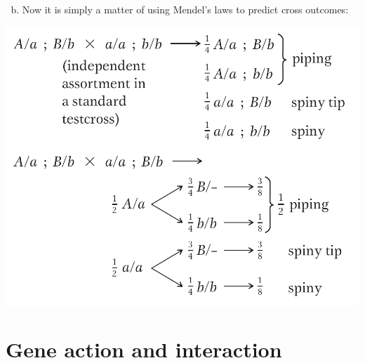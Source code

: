 \documentclass[11pt,ignorenonframetext,aspectratio=169]{beamer}
\providecommand{\tightlist}{%
  \setlength{\itemsep}{0pt}\setlength{\parskip}{0pt}}
\begin{document}
\begin{frame}{}
\protect\hypertarget{section-8}{}
\begin{enumerate}
[a.]
\setcounter{enumi}{1}
\tightlist
\item
  Now it is simply a matter of using Mendel's laws to predict cross
  outcomes:
\end{enumerate}

\begin{center}\includegraphics[width=0.4\linewidth]{./images/trait_genetics} \end{center}
\end{frame}

\hypertarget{gene-action-and-interaction}{%
\section{Gene action and
interaction}\label{gene-action-and-interaction}}
\end{document}

